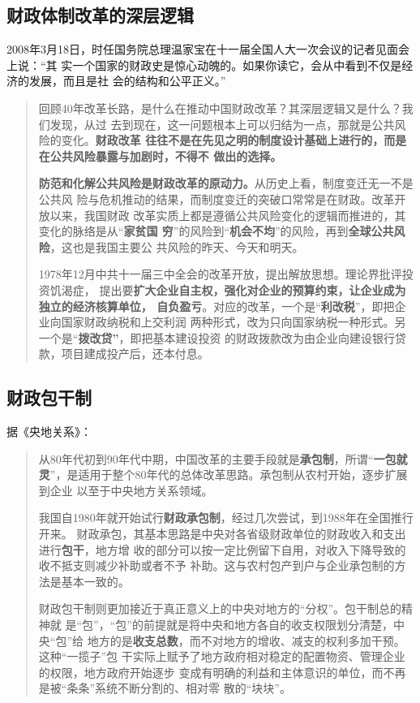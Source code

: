\subsection{财政体制改革的深层逻辑}

2008年3月18日，时任国务院总理温家宝在十一届全国人大一次会议的记者见面会上说：“其
实一个国家的财政史是惊心动魄的。如果你读它，会从中看到不仅是经济的发展，而且是社
会的结构和公平正义。”

\begin{quotation}
  回顾40年改革长路，是什么在推动中国财政改革？其深层逻辑又是什么？我们发现，从过
  去到现在，这一问题根本上可以归结为一点，那就是公共风险的变化。\textbf{财政改革
    往往不是在先见之明的制度设计基础上进行的，而是在公共风险暴露与加剧时，不得不
    做出的选择。}

  \textbf{防范和化解公共风险是财政改革的原动力。}从历史上看，制度变迁无一不是公共风
  险与危机推动的结果，而制度变迁的突破口常常是在财政。改革开放以来，我国财政
  改革实质上都是遵循公共风险变化的逻辑而推进的，其变化的脉络是从“\textbf{家贫国
    穷}”的风险到“\textbf{机会不均}”的风险，再到\textbf{全球公共风险}，这也是我国主要公
  共风险的昨天、今天和明天。\cite{cai40}

  1978年12月中共十一届三中全会的改革开放，提出解放思想。理论界批评投资饥渴症，
  提出要\textbf{扩大企业自主权，强化对企业的预算约束，让企业成为独立的经济核算单位，
  自负盈亏}。对应的改革，一个是“\textbf{利改税}”，即把企业向国家财政纳税和上交利润
  两种形式，改为只向国家纳税一种形式。另一个是“\textbf{拨改贷”}，即把基本建设投资
  的财政拨款改为由企业向建设银行贷款，项目建成投产后，还本付息。\cite{bogaidai30}
\end{quotation}

\subsection{财政包干制}

据《央地关系》\cite{yangdi}：
\begin{quotation}
  从80年代初到90年代中期，中国改革的主要手段就是\textbf{承包制}，所谓“\textbf{一包就
    灵}”，是适用于整个80年代的总体改革思路。承包制从农村开始，逐步扩展到企业
  以至于中央地方关系领域。

  我国自1980年就开始试行\textbf{财政承包制}，经过几次尝试，到1988年在全国推行开来。
  财政承包，其基本思路是中央对各省级财政单位的财政收入和支出进行\textbf{包干}，地方增
  收的部分可以按一定比例留下自用，对收入下降导致的收不抵支则减少补助或者不予
  补助。这与农村包产到户与企业承包制的方法是基本一致的。

  财政包干制则更加接近于真正意义上的中央对地方的“分权”。包干制总的精神就
  是“包”，“包”的前提就是将中央和地方各自的收支权限划分清楚，中央“包”给
  地方的是\textbf{收支总数}，而不对地方的增收、减支的权利多加干预。这种“一揽子”包
  干实际上赋予了地方政府相对稳定的配置物资、管理企业的权限，地方政府开始逐步
  变成有明确的利益和主体意识的单位，而不再是被“条条”系统不断分割的、相对零
  散的“块块”。
\end{quotation}

